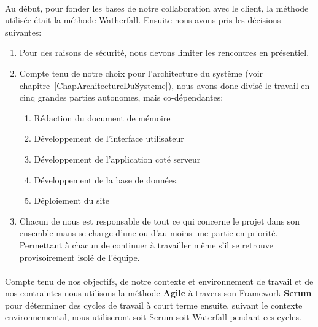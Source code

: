 		\paragraph{}Au d\'ebut, pour fonder les bases de notre collaboration avec le client, la m\'ethode utilis\'ee \'etait la m\'ethode Watherfall. Ensuite nous avons pris les d\'ecisions suivantes:
		\begin{enumerate}
			\item Pour des raisons de s\'ecurit\'e, nous devons limiter les rencontres en pr\'esentiel.

			\item Compte tenu de notre choix pour l'architecture du syst\`eme (voir chapitre~\ref{ChapArchitectureDuSysteme}), nous avons donc divis\'e le travail en cinq grandes parties autonomes, mais co-d\'ependantes:
				\begin{enumerate}
					\item R\'edaction du document de m\'emoire
					\item D\'eveloppement de l'interface utilisateur
					\item D\'eveloppement de l'application cot\'e serveur
					\item D\'eveloppement de la base de donn\'ees.
					\item D\'eploiement du site
				\end{enumerate}

			\item Chacun de nous est responsable de tout ce qui concerne le projet dans son ensemble maus se charge d'une ou d'au moins une partie en priorit\'e. Permettant \`a chacun de continuer \`a travailler m\^eme s'il se retrouve provisoirement isol\'e de l'\'equipe.
		\end{enumerate}






	 	\paragraph{} Compte tenu de nos objectifs, de notre contexte et environnement de travail et de nos contraintes nous utilisons la m\'ethode \textbf{Agile} \`a travers son Framework \textbf{Scrum} pour d\'eterminer des cycles de travail \`a court terme ensuite, suivant le contexte environnemental, nous utiliseront soit Scrum soit Waterfall pendant ces cycles.
	